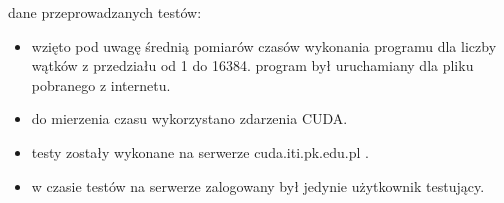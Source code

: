 \documentclass[a4paper,12pt]{article}
\newenvironment{lista}{
\begin{itemize}
  \setlength{\itemsep}{1pt}
  \setlength{\parskip}{0pt}
  \setlength{\parsep}{0pt}
}{\end{itemize}}
\begin{document}
dane przeprowadzanych testów:
\begin{lista}
 \item wzięto pod uwagę średnią pomiarów czasów wykonania programu dla liczby wątków z przedziału od 1 do 16384. 
 program był uruchamiany dla pliku pobranego z internetu.
 \item do mierzenia czasu wykorzystano zdarzenia CUDA.
 \item testy zostały wykonane na serwerze cuda.iti.pk.edu.pl . 
 \item w czasie testów na serwerze zalogowany był jedynie użytkownik testujący.
\end{lista}
\end{document}
